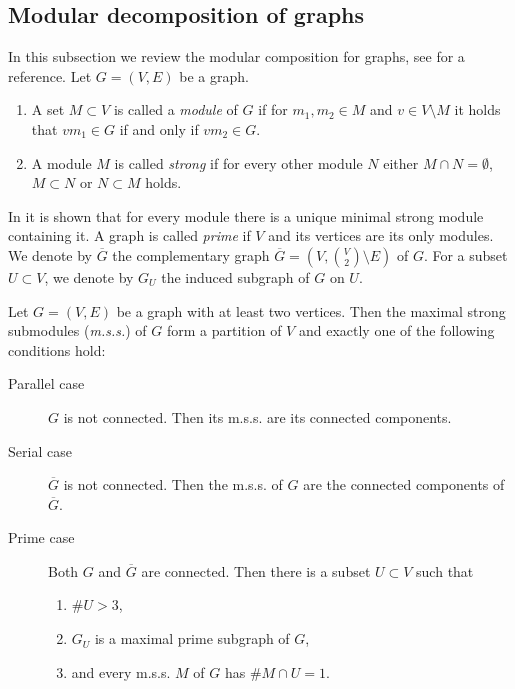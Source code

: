 \documentclass{amsart}
\makeatletter
\theoremstyle{plain}
{
	\newtheorem{{lemma}}{{Lemma}}[section]
	\labelformat{{lemma}}{{Lemma}##}
}
{
	\newtheorem{{theorem}}{{Theorem}}[section]
	\labelformat{{theorem}}{{Theorem}##}
}
{	\@namedef{c@{theorem}}{\@nameuse{c@{lemma}}}}
{
	\newtheorem{{corollary}}{{Corollary}}[section]
	\labelformat{{corollary}}{{Corollary}##}
}
{	\@namedef{c@{corollary}}{\@nameuse{c@{lemma}}}}
{
	\newtheorem{{proposition}}{{Proposition}}[section]
	\labelformat{{proposition}}{{Proposition}##}
}
{	\@namedef{c@{proposition}}{\@nameuse{c@{lemma}}}}
{
	\newtheorem{{algorithm}}{{Construction}}[section]
	\labelformat{{algorithm}}{{Construction}##}
}
{	\@namedef{c@{algorithm}}{\@nameuse{c@{lemma}}}}
\theoremstyle{definition}
{
	\newtheorem{{definition}}{{Definition}}[section]
	\labelformat{{definition}}{{Definition}##}
}
{	\@namedef{c@{definition}}{\@nameuse{c@{lemma}}}}
{
	\newtheorem{{problem}}{{Problem}}[section]
	\labelformat{{problem}}{{Problem}##}
}
{	\@namedef{c@{problem}}{\@nameuse{c@{lemma}}}}
\makeatother
\begin{document}
\subsection{Modular decomposition of graphs}
In this subsection we review the modular composition for graphs, see \cite[Chapter 1.5]{brandt} for a reference.
Let $G = (V,E)$ be a graph.
\begin{definition}
\begin{enumerate}	
	\item A set $M \subset V$ is called a \emph{module} of $G$ if for $m_1,m_2 \in M$ and $v \in V\setminus M$ it holds that $vm_1 \in G$ if and only if $vm_2 \in G$.
	\item A module $M$ is called \emph{strong} if for every other module $N$ either $M\cap N = \emptyset$, $M\subset N$ or $N \subset M$ holds.
\end{enumerate}
\end{definition}
In \cite[p. 14]{brandt} it is shown that for every module there is a unique minimal strong module containing it.
A graph is called \emph{prime} if $V$ and its vertices are its only modules.
We denote by ${\overline{{G}}}$ the complementary graph ${\overline{{G}}} = (V, \binom{V}{2}\setminus E)$ of $G$. For a subset $U \subset V$, we denote by $G_U$ the induced subgraph of $G$ on $U$.
\begin{theorem} \label{thm:moddecomp}
Let $G=(V,E)$ be a graph with at least two vertices. Then the maximal strong submodules (\emph{m.s.s.}) of $G$ form a partition of $V$ and exactly one of the following conditions hold:
\begin{description}
	\item[Parallel case] $G$ is not connected. Then its m.s.s. are its connected components.
	\item[Serial case] ${\overline{{G}}}$ is not connected. Then the m.s.s. of $G$ are the connected components of ${\overline{{G}}}$.
	\item[Prime case] Both $G$ and ${\overline{{G}}}$ are connected. Then there is a subset $U\subset V$ such that
		\begin{enumerate}
			\item $\#U > 3$,
			\item $G_U$ is a maximal prime subgraph of $G$,
			\item and every m.s.s. $M$ of $G$ has $\# M\cap U = 1$.
		\end{enumerate}
\end{description}
\end{theorem}
\end{document}
